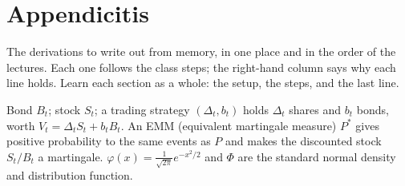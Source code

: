 \chapter{Appendicitis}\label{app:appendicitis}

The derivations to write out from memory, in one place and in the order of the lectures. Each one follows the class steps; the right-hand column says why each line holds. Learn each section as a whole: the setup, the steps, and the last line.

\begin{setup}
Bond $B_t$; stock $S_t$; a trading strategy $(\Delta_t,b_t)$ holds $\Delta_t$ shares and $b_t$ bonds, worth $V_t=\Delta_tS_t+b_tB_t$. An EMM (equivalent martingale measure) $P^*$ gives positive probability to the same events as $P$ and makes the discounted stock $S_t/B_t$ a martingale. $\varphi(x)=\frac1{\sqrt{2\pi}}e^{-x^2/2}$ and $\Phi$ are the standard normal density and distribution function.
\end{setup}

